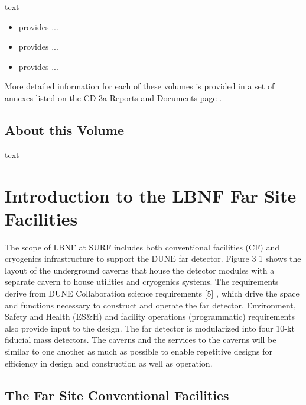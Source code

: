 text 
\begin{itemize}
 \item \volintro{} provides ... \fixme{}
 \item \volfscf{} provides ... \fixme{}
 \item \volcryo{} provides ... \fixme{}
\end{itemize}

More detailed information for each of these volumes is provided in a set of annexes listed on the CD-3a Reports and Documents page .

\subsection{About this Volume}
\label{sec:pdr-volumes-vol1}

text

\section{Introduction to the LBNF Far Site Facilities}
\label{sec:fs-facil-intro}


The scope of LBNF at SURF includes both conventional facilities (CF) and cryogenics infrastructure to support the DUNE far detector. Figure 3 1 \fixme{} shows the layout of the underground caverns that house the detector modules with a separate cavern to house utilities and cryogenics systems. The requirements derive from DUNE Collaboration science requirements [5] \fixme{}, which drive the space and functions necessary to construct and operate the far detector.  Environment, Safety and Health (ES\&H) and facility operations (programmatic) requirements also provide input to the design. The far detector is modularized into four 10-kt fiducial mass detectors. The caverns and the services to the caverns will be similar to one another as much as possible to enable repetitive designs for efficiency in design and construction as well as operation. 



\subsection{The Far Site Conventional Facilities}
\label{sec:fs-facil-cf}

